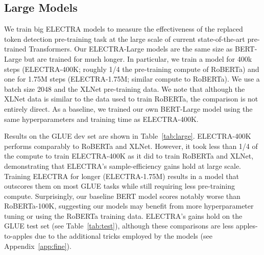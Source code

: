 \documentclass{article}
\begin{document}
\subsection{Large Models}
We train big ELECTRA models to measure the effectiveness of the replaced token detection pre-training task at the large scale of current state-of-the-art pre-trained Transformers.
Our ELECTRA-Large models are the same size as BERT-Large but are trained for much longer.
In particular, we train a model for 400k steps (ELECTRA-400K; roughly 1/4 the pre-training compute of RoBERTa) and one for 1.75M steps (ELECTRA-1.75M; similar compute to RoBERTa).
We use a batch size 2048 and the XLNet pre-training data.
We note that although the XLNet data is similar to the data used to train RoBERTa, the comparison is not entirely direct. 
As a baseline, we trained our own BERT-Large model using the same hyperparameters and training time as ELECTRA-400K.

Results on the GLUE dev set are shown in Table~\ref{tab:large}. 
ELECTRA-400K performs comparably to RoBERTa and XLNet. 
However, it took less than 1/4 of the compute to train ELECTRA-400K as it did to train RoBERTa and XLNet, demonstrating that ELECTRA's sample-efficiency gains hold at large scale.
Training ELECTRA for longer (ELECTRA-1.75M) results in a model that outscores them on most GLUE tasks while still requiring less pre-training compute.
Surprisingly, our baseline BERT model scores notably worse than RoBERTa-100K, suggesting our models may benefit from more hyperparameter tuning or using the RoBERTa training data.
ELECTRA's gains hold on the GLUE test set (see Table~\ref{tab:test}), although these comparisons are less apples-to-apples due to the additional tricks employed by the models (see Appendix~\ref{app:fine}).  \\
\end{document}
